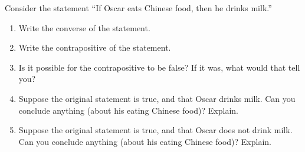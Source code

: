 \documentclass[11pt,]{book}
\theoremstyle{ptxplainnotitle}
\theoremstyle{ptxplaintitle}
\theoremstyle{ptxdefinitionnotitle}
\theoremstyle{ptxdefinitiontitle}
\theoremstyle{ptxdefinitionnotitle}
\theoremstyle{ptxdefinitiontitle}
\theoremstyle{ptxdefinitionnotitle}
\theoremstyle{ptxdefinitiontitle}
\theoremstyle{ptxdefinitiontitlenonumber}
\theoremstyle{ptxdefinitiontitlenonumber}
\numberwithin{equation}{chapter}
\begin{document}
\begin{divisionexercise}{14}\hypertarget{exercise-162}{}
\hypertarget{p-2289}{}%
Consider the statement ``If Oscar eats Chinese food, then he drinks milk.'' \leavevmode%
\begin{enumerate}[label=(\alph*)]
\item\hypertarget{li-1173}{}\hypertarget{p-2290}{}%
Write the converse of the statement.%
\item\hypertarget{li-1174}{}\hypertarget{p-2291}{}%
Write the contrapositive of the statement.%
\item\hypertarget{li-1175}{}\hypertarget{p-2292}{}%
Is it possible for the contrapositive to be false? If it was, what would that tell you?%
\item\hypertarget{li-1176}{}\hypertarget{p-2293}{}%
Suppose the original statement is true, and that Oscar drinks milk. Can you conclude anything (about his eating Chinese food)? Explain.%
\item\hypertarget{li-1177}{}\hypertarget{p-2294}{}%
Suppose the original statement is true, and that Oscar does not drink milk. Can you conclude anything (about his eating Chinese food)? Explain.%
\end{enumerate}
%
\end{divisionexercise}%
\end{document}
